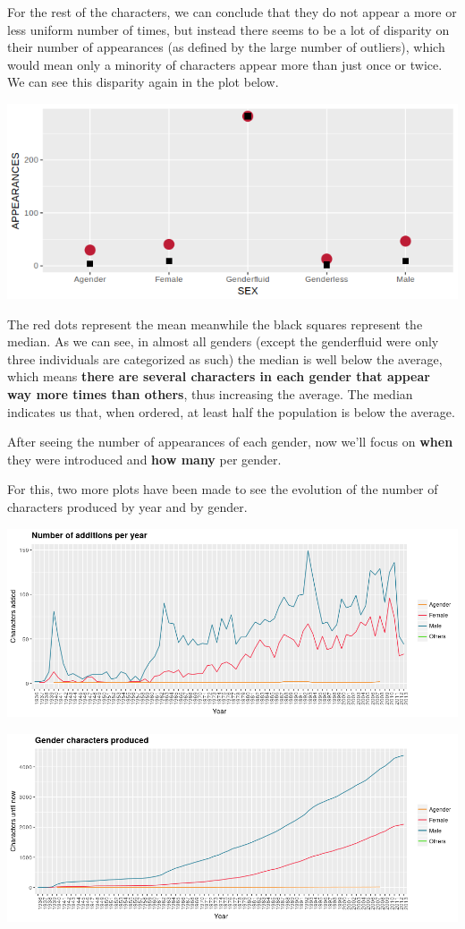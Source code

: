 For the rest of the characters, we can conclude that they do not appear a more or less uniform number of times, but instead there seems to be a lot of disparity on their number of appearances (as defined by the large number of outliers), which would mean only a minority of characters appear more than just once or twice. We can see this disparity again  in the plot below.
\begin{center}
   \includegraphics[width=0.6\linewidth]{img/mean_median.png}
\end{center}

The red dots represent the mean meanwhile the black squares represent the median. As we can see, in almost all genders (except the genderfluid were only three individuals are categorized as such) the median is well below the average, which means \textbf{there are several characters in each gender that appear way more times than others}, thus increasing the average. The median indicates us that, when ordered, at least half the population is below the average.


After seeing the number of appearances of each gender, now we'll focus on \textbf{when} they  were introduced and \textbf{how many} per gender.

For this, two more plots have been made to see the evolution of the number of characters produced by year and by gender.

\begin{center}
   \includegraphics[width=\linewidth]{img/add_per_year.png}
 \end{center}
 \begin{center}
   \includegraphics[width=\linewidth]{img/gender_char_prod.png}
\end{center}

